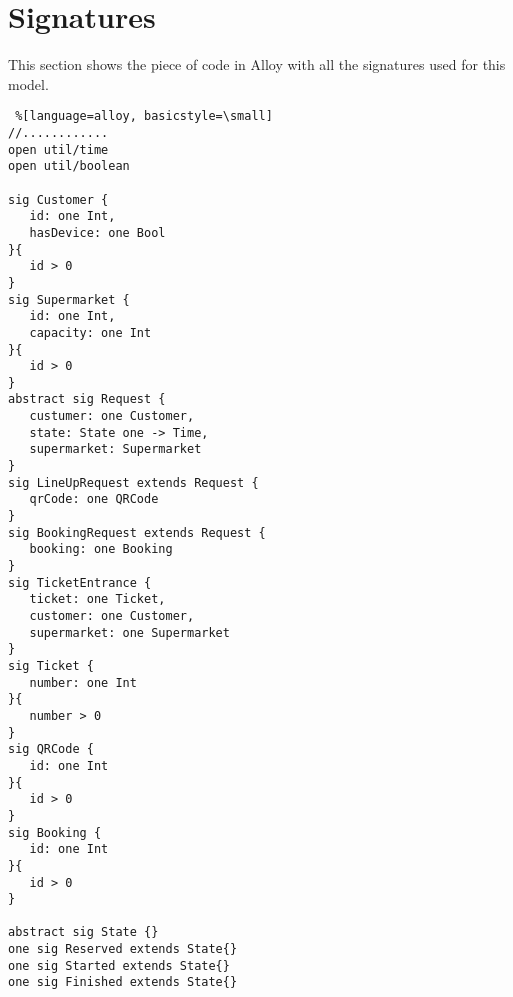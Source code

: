 \section{Signatures}
This section shows the piece of code in Alloy with all the signatures used for this model.


\begin{lstlisting} %[language=alloy, basicstyle=\small] 
//............
open util/time
open util/boolean

sig Customer {
   id: one Int,
   hasDevice: one Bool
}{
   id > 0
}
sig Supermarket {
   id: one Int,
   capacity: one Int
}{
   id > 0
}
abstract sig Request {
   custumer: one Customer,
   state: State one -> Time,
   supermarket: Supermarket
}
sig LineUpRequest extends Request {
   qrCode: one QRCode
}
sig BookingRequest extends Request {
   booking: one Booking
}
sig TicketEntrance {
   ticket: one Ticket,
   customer: one Customer,
   supermarket: one Supermarket
}
sig Ticket {
   number: one Int
}{
   number > 0
}
sig QRCode {
   id: one Int
}{
   id > 0
}
sig Booking {
   id: one Int
}{
   id > 0
}

abstract sig State {}
one sig Reserved extends State{}
one sig Started extends State{}
one sig Finished extends State{}


\end{lstlisting} 



